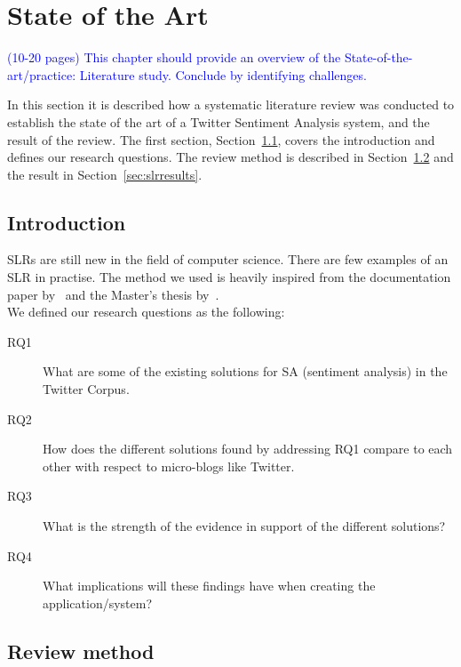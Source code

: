 \chapter{State of the Art}

\textcolor{blue}{(10-20 pages) This chapter should provide an overview of the State-of-the-art/practice: Literature 
study. Conclude by identifying challenges.}

In this section it is described how a systematic literature review was conducted to establish the state of the art of a Twitter Sentiment Analysis system, and the result of the review. The first section, Section~\ref{sec:slrintro}, covers the introduction and defines our research questions. The review method is described in Section~\ref{sec:slrmethod} and the result in Section~\ref{sec:slrresults}.

\section{Introduction}
\label{sec:slrintro}

SLRs are still new in the field of computer science. There are few examples of an SLR in practise. The method we used is heavily inspired from the documentation paper by~\cite{paper:slrdesc} and the Master's thesis by~\cite{master:slr}. \\

\noindent We defined our research questions as the following:

\begin{description}

\item[RQ1] What are some of the existing solutions for SA (sentiment analysis) in the Twitter Corpus.
\item[RQ2] How does the different solutions found by addressing RQ1 compare to each other with respect to micro-blogs like Twitter.
\item[RQ3] What is the strength of the evidence in support of the different solutions?
\item[RQ4] What implications will these findings have when creating the application/system?

\end{description}

\section{Review method}
\label{sec:slrmethod}

